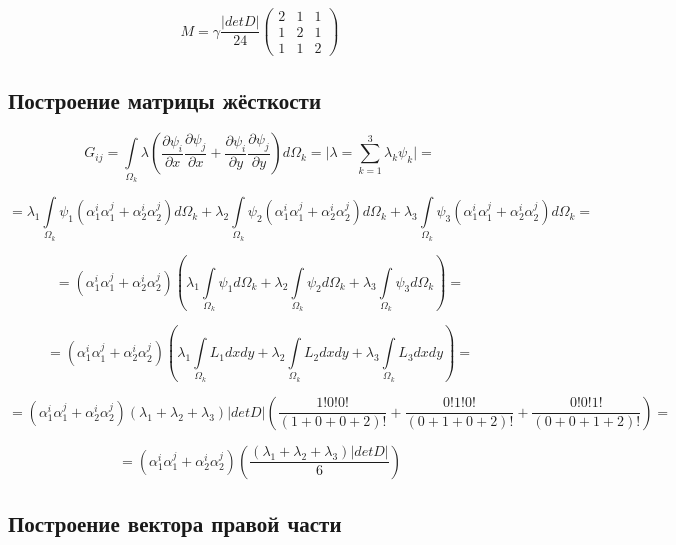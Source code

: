 \documentclass[12pt,a4paper]{article}
\begin{document}
$$
M = \gamma \frac{\vert det D \vert}{24}
\begin{pmatrix}
    2 & 1 & 1 \\
    1 & 2 & 1 \\
    1 & 1 & 2
\end{pmatrix}
$$

\subsection*{Построение матрицы жёсткости}

$$
    G_{ij} =
    \int \limits_{\Omega_k} \lambda \left(
        \frac{\partial \psi_i}{\partial x}
        \frac{\partial \psi_j}{\partial x}
        +
        \frac{\partial \psi_i}{\partial y}
        \frac{\partial \psi_j}{\partial y}
        \right) d \Omega_k
        =
        \bigg\vert \lambda = \sum \limits_{k=1}^3 \lambda_k \psi_k \bigg\vert
        =
$$

$$
        =
        \lambda_1 \int \limits_{\Omega_k} \psi_1 (\alpha_1^i \alpha_1^j + \alpha_2^i \alpha_2^j) d \Omega_k
        +
        \lambda_2 \int \limits_{\Omega_k} \psi_2 (\alpha_1^i \alpha_1^j + \alpha_2^i \alpha_2^j) d \Omega_k
        +
        \lambda_3 \int \limits_{\Omega_k} \psi_3 (\alpha_1^i \alpha_1^j + \alpha_2^i \alpha_2^j) d \Omega_k
        =
$$

$$
        =
        (\alpha_1^i \alpha_1^j + \alpha_2^i \alpha_2^j) \left(
            \lambda_1 \int \limits_{\Omega_k} \psi_1  d \Omega_k +
            \lambda_2 \int \limits_{\Omega_k} \psi_2  d \Omega_k +
            \lambda_3 \int \limits_{\Omega_k} \psi_3  d \Omega_k
        \right)
        =
$$

$$
        =
        (\alpha_1^i \alpha_1^j + \alpha_2^i \alpha_2^j) \left(
            \lambda_1 \int \limits_{\Omega_k} L_1 dxdy +
            \lambda_2 \int \limits_{\Omega_k} L_2 dxdy +
            \lambda_3 \int \limits_{\Omega_k} L_3 dxdy
        \right)
        =
$$

$$
        =
        (\alpha_1^i \alpha_1^j + \alpha_2^i \alpha_2^j)
        (\lambda_1 + \lambda_2 + \lambda_3) \vert detD \vert
        \left(
            \frac{1!0!0!}{(1+0+0+2)!} +
            \frac{0!1!0!}{(0+1+0+2)!} +
            \frac{0!0!1!}{(0+0+1+2)!}
        \right)
        =
$$

$$
        =
        (\alpha_1^i \alpha_1^j + \alpha_2^i \alpha_2^j) \left(
            \frac{(\lambda_1 + \lambda_2 + \lambda_3) \vert detD \vert}{6}
        \right)
$$

\subsection*{Построение вектора правой части}
\end{document}
